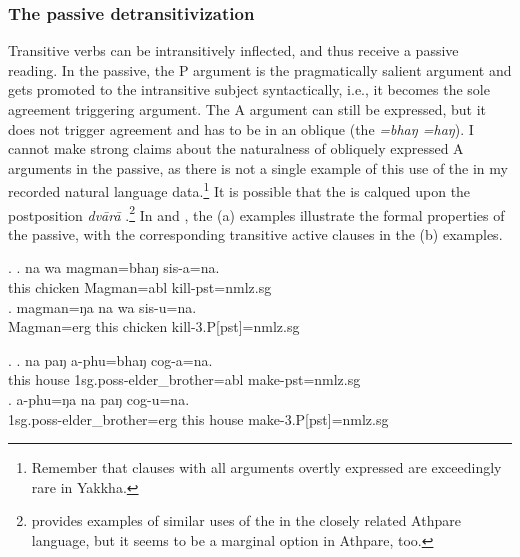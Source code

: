 
\subsubsection{The passive detransitivization}\label{detr-pass}

Transitive verbs can be intransitively inflected, and thus receive a passive reading. In the passive, the P argument is the pragmatically salient argument and gets promoted to the intransitive subject syntactically, i.e., it becomes the sole agreement triggering argument. The  A argument can still be expressed, but it does not trigger agreement and has to be in an oblique  (the  \emph{=bhaŋ \ti =haŋ}). I cannot make strong claims about the naturalness of obliquely expressed A arguments in the passive, as there is not a single example of this use of the  in my recorded natural language data.\footnote{Remember that clauses with all arguments overtly expressed are exceedingly rare in Yakkha.}  It is possible that the  is calqued upon the  postposition \emph{dvārā} .\footnote{\citet[123]{Ebert1997A-grammar} provides examples of similar uses of the  in the closely related Athpare language, but it seems to be a marginal option in Athpare, too.}  In  \Next and \NNext, the (a) examples illustrate the formal properties of the passive, with the corresponding transitive active clauses in the (b) examples.

\ex. \ag. na wa magman=bhaŋ sis-a=na.\\
			this chicken  Magman{\sc =abl} kill{\sc [3sg]-pst=nmlz.sg}\\
	\bg. magman=ŋa na wa sis-u=na.\\
		Magman{\sc =erg}	this chicken  kill{\sc -3.P[pst]=nmlz.sg}\\
		
	\ex. \ag.  na paŋ a-phu=bhaŋ cog-a=na.\\
	this house  {\sc 1sg.poss-}elder\_brother{\sc =abl} make{\sc [3sg]-pst=nmlz.sg}\\
	\bg. a-phu=ŋa na paŋ cog-u=na.\\
	 {\sc 1sg.poss-}elder\_brother{\sc =erg} this house make{\sc -3.P[pst]=nmlz.sg}\\


